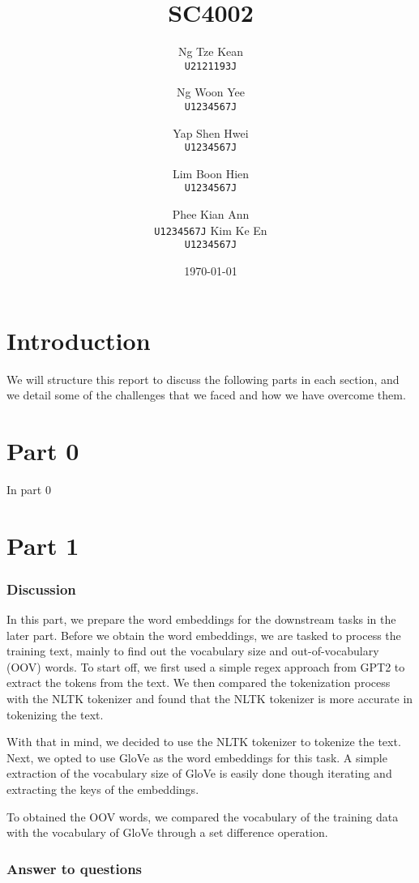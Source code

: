 \documentclass{article}
\title{SC4002}
\author{
  Ng Tze Kean\\
  \texttt{U2121193J} \and
  Ng Woon Yee\\
  \texttt{U1234567J} \and
  Yap Shen Hwei\\
  \texttt{U1234567J} \and
  Lim Boon Hien\\
  \texttt{U1234567J} \and
  Phee Kian Ann\\
  \texttt{U1234567J}
  Kim Ke En\\
  \texttt{U1234567J}
}
\date{\today}
\begin{document}
\maketitle

\section*{Introduction}
We will structure this report to discuss the following parts in each section,
and we detail some of the challenges that we faced and how we have overcome
them.

\section*{Part 0}

In part 0

\section*{Part 1}

\subsubsection*{Discussion}

In this part, we prepare the word embeddings for the downstream tasks in the
later part. Before we obtain the word embeddings, we are tasked to process the
training text, mainly to find out the vocabulary size and out-of-vocabulary
(OOV) words. To start off, we first used a simple regex approach from GPT2 to
extract the tokens from the text. We then compared the tokenization process
with the NLTK tokenizer and found that the NLTK tokenizer is more accurate in
tokenizing the text.


With that in mind, we decided to use the NLTK tokenizer to tokenize the text.
Next, we opted to use GloVe as the word embeddings for this task. A simple
extraction of the vocabulary size of GloVe is easily done though iterating and
extracting the keys of the embeddings.

To obtained the OOV words, we compared the vocabulary of the training data with
the vocabulary of GloVe through a set difference operation.

\subsubsection*{Answer to questions}
\end{document}

